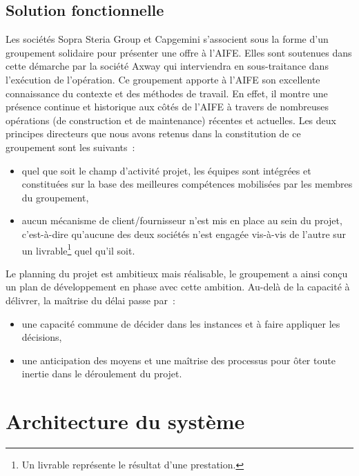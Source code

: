 \documentclass[12pt,a4paper]{article}
\begin{document}
\subsection{Solution fonctionnelle}
Les sociétés Sopra Steria Group et Capgemini s’associent sous la forme d’un groupement solidaire pour présenter une offre à l’AIFE. Elles sont soutenues dans cette démarche par la société Axway qui interviendra en sous-traitance dans l’exécution de l’opération.
\smallbreak
Ce groupement apporte à l’AIFE son excellente connaissance du contexte et des méthodes de travail. En effet, il montre une présence continue et historique aux côtés de l’AIFE à travers de nombreuses opérations (de construction et de maintenance) récentes et actuelles.
\smallbreak
Les deux principes directeurs que nous avons retenus dans la constitution de ce groupement sont les suivants~:
\smallbreak
\begin{itemize}
\item quel que soit le champ d’activité projet, les équipes sont intégrées et constituées sur la base des meilleures compétences mobilisées par les membres du groupement,
\item aucun mécanisme de client/fournisseur n’est mis en place au sein du projet, c’est-à-dire qu’aucune des deux sociétés n’est engagée vis-à-vis de l’autre sur un livrable\footnote{Un livrable représente le résultat d'une prestation.} quel qu’il soit.
\end{itemize}
\medbreak
Le planning du projet est ambitieux mais réalisable, le groupement a ainsi conçu un plan de développement en phase avec cette ambition. Au-delà de la capacité à délivrer, la maîtrise du délai passe par~:
\smallbreak
\begin{itemize}
\item une capacité commune de décider dans les instances et à faire appliquer les décisions,
\item une anticipation des moyens et une maîtrise des processus pour ôter toute inertie dans le déroulement du projet.
\end{itemize}
\smallbreak
\newpage
\clearpage
\section{Architecture du système}
\end{document}
